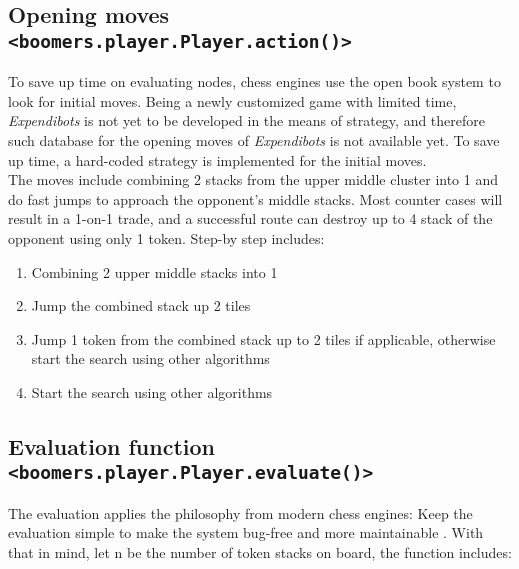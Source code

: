\documentclass[]{article}
\newcommand{\gameName}{Expendibots}
\begin{document}
\subsection{Opening moves \texttt{<boomers.player.Player.action()>}}
To save up time on evaluating nodes, chess engines use the open book system to look for initial moves. Being a newly customized game with limited time, \emph{\gameName}
is not yet to be developed in the means of strategy, and therefore such database for the opening moves of \emph{\gameName} is not available yet. To save up time, a hard-coded strategy is implemented for the initial moves.\\

The moves include combining 2 stacks from the upper middle cluster into 1 and do fast jumps to approach the opponent's middle stacks. Most counter cases will result in a 1-on-1 trade, and a successful route can destroy up to 4 stack of the opponent using only 1 token. Step-by step includes:

\begin{enumerate}
    \item Combining 2 upper middle stacks into 1
    \item Jump the combined stack up 2 tiles
    \item Jump 1 token from the combined stack up to 2 tiles if applicable, otherwise start the search using other algorithms
    \item Start the search using other algorithms
\end{enumerate}

\subsection{Evaluation function \texttt{<boomers.player.Player.evaluate()>}}

The evaluation applies the philosophy from modern chess engines: Keep the evaluation simple to make the system bug-free and more maintainable \cite{eval}. With that in mind, let n be the number of token stacks on board, the function includes:
\end{document}
